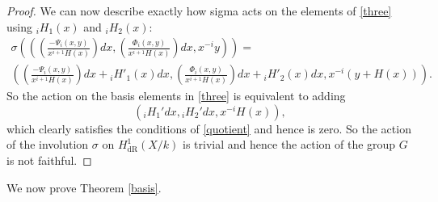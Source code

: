 \documentclass[draft, 11pt]{article} %
\theoremstyle{plain}
\theoremstyle{remark}
\newcommand{\derhamhone}{H_{\text {dR}}^1(X/k)}
\begin{document}
\begin{proof}
We can now describe exactly how sigma acts on the elements of \eqref{three} using ${}_iH_1(x)$ and ${}_iH_2(x)$:
\begin{multline}
\sigma \left( \left( \left(\frac{-\Psi_i(x,y)}{x^{i+1}H(x)}\right) dx, \left( \frac{\Phi_i(x,y)}{x^{i+1}H(x)} \right) dx, x^{-i}y \right)\right) = \\
 \left( \left(\frac{-\Psi_i(x,y)}{x^{i+1}H(x)} \right) dx + {}_iH'_1(x)dx,  \left( \frac{\Phi_i(x,y)}{x^{i+1}H(x)} \right) dx+ {}_iH'_2(x)dx, x^{-i}(y+H(x)) \right).
\end{multline}
So the action on the basis elements in \eqref{three} is equivalent to adding 
\[
\left( {}_iH_1'dx, {}_iH_2'dx, x^{-i}H(x) \right),
\]
which clearly satisfies the conditions of \eqref{quotient} and hence is zero.
So the action of the involution $\sigma$ on $\derhamhone$ is trivial and hence the action of the group $G$ is not faithful.
\begin{comment}
Hence the action is trivial if and only if ${}_iH_1'(x)dx = {}_iH_2'(x)dx =0$.
This cannot happen though, since we can always find an $l\in \{0,1\}$ such that $l \not\equiv d\ \text{mod}\ 2$, and then $d\left({}_iH_2(x)\right) = {}_iH_2'(x)dx \neq 0$, as we can see from the leading term (unless of course $d$ is zero, in which case $d\left({}_iH_1(x)\right) \neq 0$).
\end{comment}
\end{proof}


We now prove Theorem \ref{basis}.
\end{document}
